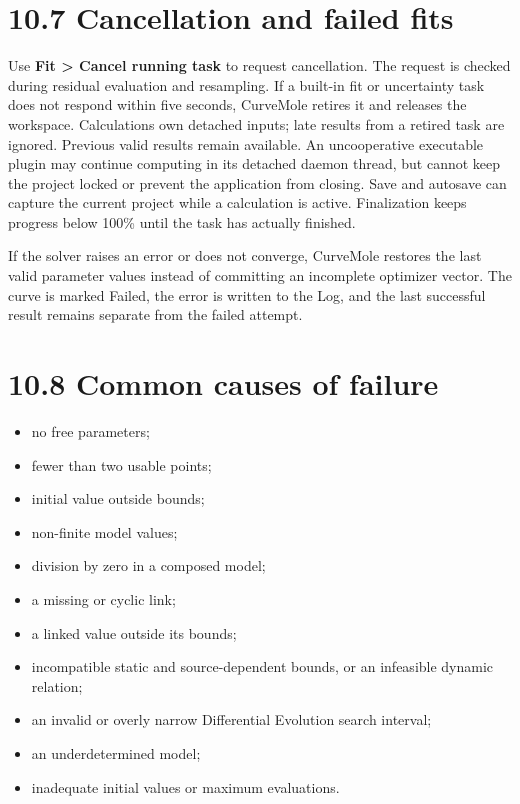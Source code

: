 \documentclass[
  10pt,
  a4paper,
  oneside]{scrreprt}
\providecommand{\tightlist}{%
  \setlength{\itemsep}{0pt}\setlength{\parskip}{0pt}}
\begin{document}
\hypertarget{cancellation-and-failed-fits}{%
\section{10.7 Cancellation and failed
fits}\label{cancellation-and-failed-fits}}

Use \textbf{Fit \textgreater{} Cancel running task} to request
cancellation. The request is checked during residual evaluation and
resampling. If a built-in fit or uncertainty task does not respond
within five seconds, CurveMole retires it and releases the workspace.
Calculations own detached inputs; late results from a retired task are
ignored. Previous valid results remain available. An uncooperative
executable plugin may continue computing in its detached daemon thread,
but cannot keep the project locked or prevent the application from
closing. Save and autosave can capture the current project while a
calculation is active. Finalization keeps progress below 100\% until the
task has actually finished.

If the solver raises an error or does not converge, CurveMole restores
the last valid parameter values instead of committing an incomplete
optimizer vector. The curve is marked Failed, the error is written to
the Log, and the last successful result remains separate from the failed
attempt.

\hypertarget{common-causes-of-failure}{%
\section{10.8 Common causes of failure}\label{common-causes-of-failure}}

\begin{itemize}
\tightlist
\item
  no free parameters;
\item
  fewer than two usable points;
\item
  initial value outside bounds;
\item
  non-finite model values;
\item
  division by zero in a composed model;
\item
  a missing or cyclic link;
\item
  a linked value outside its bounds;
\item
  incompatible static and source-dependent bounds, or an infeasible
  dynamic relation;
\item
  an invalid or overly narrow Differential Evolution search interval;
\item
  an underdetermined model;
\item
  inadequate initial values or maximum evaluations.
\end{itemize}
\end{document}
